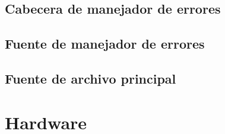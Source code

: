 \subsection{Cabecera de manejador de errores}


\subsection{Fuente de manejador de errores}\label{cap:errors}


\subsection{Fuente de archivo principal}


\newpage
\section{Hardware}
